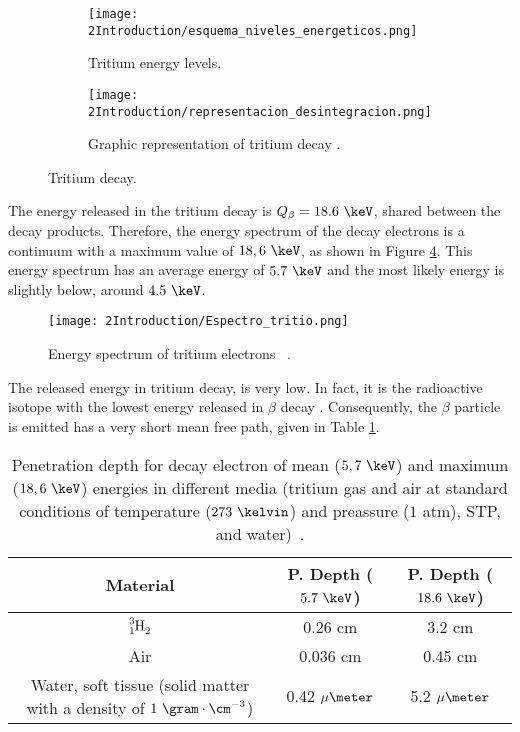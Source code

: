 \begin{figure}
\centering
    \begin{subfigure}[b]{0.45\textwidth}
    \centering
    \texttt{[image: 2Introduction/esquema\_niveles\_energeticos.png]}  
    \caption{Tritium energy levels. \cite{TritiumDecayEnergyLevels}\label{subfig:Energy_levels}}
    \end{subfigure}
    \hfill
    \begin{subfigure}[b]{0.45\textwidth}
    \centering
    \texttt{[image: 2Introduction/representacion\_desintegracion.png]}  
    \caption{Graphic representation of tritium decay \cite{TritiumDecayImage}.\label{subfig:GraphicDesintegration}}
    \end{subfigure}
 \caption{Tritium decay.}
 \label{fig:TritiumDecay}
\end{figure}

The energy released in the tritium decay is $Q_\beta=18.6~\keV$, shared between the decay products. Therefore, the energy spectrum of the decay electrons is a continuum with a maximum value of $18,6~\keV$, as shown in Figure \ref{fig:TritiumDecaySpectrum}. This energy spectrum has an average energy of $5.7~\keV$ and the most likely energy is slightly below, around $4.5~\keV$.

\begin{figure}[hbtp]
\texttt{[image: 2Introduction/Espectro\_tritio.png]}
\centering
\caption{Energy spectrum of tritium electrons ~\cite{TritiumEspectrum}.\label{fig:TritiumDecaySpectrum}}
\end{figure}

The released energy in tritium decay, is very low. In fact, it is the radioactive isotope with the lowest energy released in $\beta$ decay \cite{TritiumHandling}. Consequently, the $\beta$ particle is emitted has a very short mean free path, given in Table \ref{tab:MeanFreePathTritium}.

\begin{table}[htbp]
\begin{center}
\begin{tabular}{|c|c|c|}
\hline
Material & P. Depth ($5.7~\keV$) & P. Depth ($18.6~\keV$)\\
\hline \hline \hline
$\ce{\ce{^{3}_{1}H_2}}$ & 0.26 cm & 3.2 cm \\ \hline
Air & 0.036 cm & 0.45 cm \\ \hline
\parbox{10em}{\centering Water, soft tissue\\  (solid matter with a \\  density of $1~\gram\cdot\cm^{-3}$)} & 0.42 $\mu\meter$ & 5.2 $\mu\meter$ \\ \hline
\end{tabular}
\caption{Penetration depth for decay electron of mean ($5,7~\keV$) and maximum ($18,6~\keV$) energies in different media (tritium gas and air at standard conditions of temperature ($273~\kelvin$) and preassure ($1$ atm), STP, and water)~\cite{MeanFreePathDocument}.}
\label{tab:MeanFreePathTritium}
\end{center}
\end{table}

